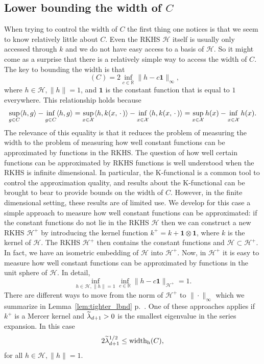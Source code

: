 \documentclass[10pt]{amsart}
\theoremstyle{definition}\newtheorem{defi}[theo]{Definition}\newtheorem{rema}[theo]{Remark}\newtheorem{exam}[theo]{Example}\newtheorem{exem}[theo]{Example}\newtheorem{nota}[theo]{Notation}
\theoremstyle{remark}
\DeclareMathOperator*{\infd}{inf\vphantom{p}}
\DeclareMathOperator{\diamh}{{width}_h}
\newcommand{\R}{\mathbb{R}}
\newcommand{\X}{\mathcal{X}}
\newcommand{\cH}{\mathcal{H}}
\let\oldtilde\tilde
\renewcommand*{\tilde}[1]{\mathchoice{\widetilde{#1}}{\widetilde{#1}}{\oldtilde{#1}}{\oldtilde{#1}}}
\begin{document}
\subsection{Lower bounding the width of \texorpdfstring{$C$}{C}}

When trying to control the width of $C$ the first thing one notices is that we seem to know relatively little about $C$. Even the RKHS $\cH$ itself is usually only accessed through $k$ and we do not have easy access to a basis of $\cH$. So it might come as a surprise that there is a relatively simple way to access the width of $C$. The key to bounding the width is that
\begin{equation*}
\diamh(C) = 2 \inf_{c\in \R} \|h - c \bm 1\|_\infty,
\end{equation*}
where $h\in \cH, \|h\|=1$, and $\bm 1$ is the constant function that is equal to $1$ everywhere. This relationship holds because
\begin{align*}
\sup_{g \in C} \langle h,g \rangle -\infd_{g\in C} \langle h,g \rangle = \sup_{x \in \X} \langle h, k(x,\,\cdot\,) \rangle -\infd_{x \in \X} \langle h, k(x,\,\cdot\,) \rangle = \sup_{x\in \X} h(x) - \infd_{x \in \X} h(x).
\end{align*}
The relevance of this equality is that it reduces the problem of measuring the width to the problem of measuring how well constant functions can be approximated by functions in the RKHS. The question of how well certain functions can be approximated by RKHS functions is well understood when the RKHS is infinite dimensional. In particular, the K-functional is a common tool to control the approximation quality, and results about the K-functional can be brought to bear to provide bounds on the width of $C$. However, in the finite dimensional setting, these results are of limited use. We develop for this case a simple approach to measure how well constant functions can be approximated: if the constant functions do not lie in the RKHS $\cH$ then we can construct a new RKHS $\cH^+$ by introducing the kernel function $k^+ = k + \bm 1 \otimes \bm 1$, where $k$ is the kernel of $\cH$. The RKHS $\cH^+$ then contains the constant functions and $\cH \subset \cH^+$. In fact, we have an isometric embedding of $\cH$ into $\cH^+$. Now, in $\cH^+$ it is easy to measure how well constant functions can be approximated by functions in the unit sphere of $\cH$. In detail,
\[
\inf_{h \in \cH, \|h\|=1} \inf_{c\in \R} \|h - c\bm 1\|_{\cH^+} = 1.
\]
There are different ways to move from the norm of $\cH^+$ to $\|\cdot\|_\infty$ which we summarize in Lemma~\ref{lem:tighter_lbnd} p.~\pageref{lem:tighter_lbnd}. One of these approaches applies if $k^+$ is a Mercer kernel and $\tilde \lambda_{d+1} > 0$ is the smallest eigenvalue in the series expansion. In this case
\[
2 \tilde \lambda_{d+1}^{1/2} \leq \diamh(C),
\]
for all $h\in \cH, \|h\|=1$.
\end{document}
